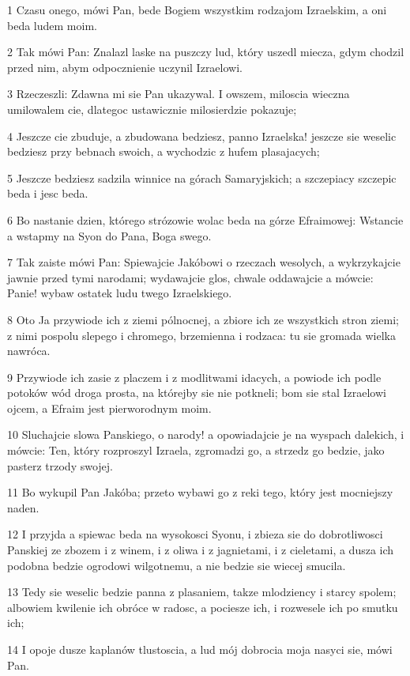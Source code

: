 \par 1 Czasu onego, mówi Pan, bede Bogiem wszystkim rodzajom Izraelskim, a oni beda ludem moim.
\par 2 Tak mówi Pan: Znalazl laske na puszczy lud, który uszedl miecza, gdym chodzil przed nim, abym odpocznienie uczynil Izraelowi.
\par 3 Rzeczeszli: Zdawna mi sie Pan ukazywal. I owszem, miloscia wieczna umilowalem cie, dlategoc ustawicznie milosierdzie pokazuje;
\par 4 Jeszcze cie zbuduje, a zbudowana bedziesz, panno Izraelska! jeszcze sie weselic bedziesz przy bebnach swoich, a wychodzic z hufem plasajacych;
\par 5 Jeszcze bedziesz sadzila winnice na górach Samaryjskich; a szczepiacy szczepic beda i jesc beda.
\par 6 Bo nastanie dzien, którego strózowie wolac beda na górze Efraimowej: Wstancie a wstapmy na Syon do Pana, Boga swego.
\par 7 Tak zaiste mówi Pan: Spiewajcie Jakóbowi o rzeczach wesolych, a wykrzykajcie jawnie przed tymi narodami; wydawajcie glos, chwale oddawajcie a mówcie: Panie! wybaw ostatek ludu twego Izraelskiego.
\par 8 Oto Ja przywiode ich z ziemi pólnocnej, a zbiore ich ze wszystkich stron ziemi; z nimi pospolu slepego i chromego, brzemienna i rodzaca: tu sie gromada wielka nawróca.
\par 9 Przywiode ich zasie z placzem i z modlitwami idacych, a powiode ich podle potoków wód droga prosta, na którejby sie nie potkneli; bom sie stal Izraelowi ojcem, a Efraim jest pierworodnym moim.
\par 10 Sluchajcie slowa Panskiego, o narody! a opowiadajcie je na wyspach dalekich, i mówcie: Ten, który rozproszyl Izraela, zgromadzi go, a strzedz go bedzie, jako pasterz trzody swojej.
\par 11 Bo wykupil Pan Jakóba; przeto wybawi go z reki tego, który jest mocniejszy naden.
\par 12 I przyjda a spiewac beda na wysokosci Syonu, i zbieza sie do dobrotliwosci Panskiej ze zbozem i z winem, i z oliwa i z jagnietami, i z cieletami, a dusza ich podobna bedzie ogrodowi wilgotnemu, a nie bedzie sie wiecej smucila.
\par 13 Tedy sie weselic bedzie panna z plasaniem, takze mlodziency i starcy spolem; albowiem kwilenie ich obróce w radosc, a pociesze ich, i rozwesele ich po smutku ich;
\par 14 I opoje dusze kaplanów tlustoscia, a lud mój dobrocia moja nasyci sie, mówi Pan.
